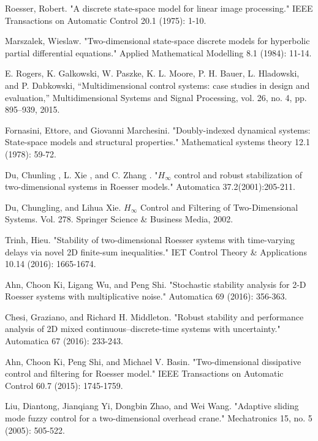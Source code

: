 \documentclass[conference]{IEEEtran}
\begin{document}
\begin{thebibliography}{1}
	
	
	
	
	
	
	
	Roesser, Robert. "A discrete state-space model for linear image processing." IEEE Transactions on Automatic Control 20.1 (1975): 1-10.
	
	Marszalek, Wieslaw. "Two-dimensional state-space discrete models for hyperbolic partial differential equations." Applied Mathematical Modelling 8.1 (1984): 11-14.
	
	E. Rogers, K. Galkowski, W. Paszke, K. L. Moore, P. H. Bauer, L. Hladowski, and P. Dabkowski, “Multidimensional control systems: case studies in design and evaluation,” Multidimensional Systems and Signal Processing, vol. 26, no. 4, pp. 895–939, 2015.
	
	Fornasini, Ettore, and Giovanni Marchesini. "Doubly-indexed dynamical systems: State-space models and structural properties." Mathematical systems theory 12.1 (1978): 59-72.
	
	Du, Chunling , L. Xie , and C. Zhang . "$H_{\infty}$ control and robust stabilization of two-dimensional systems in Roesser models." Automatica 37.2(2001):205-211.
	
	Du, Chungling, and Lihua Xie. $H_{\infty}$ Control and Filtering of Two-Dimensional Systems. Vol. 278. Springer Science \& Business Media, 2002.
	
	Trinh, Hieu. "Stability of two-dimensional Roesser systems with time-varying delays via novel 2D finite-sum inequalities." IET Control Theory \& Applications 10.14 (2016): 1665-1674.
	
	Ahn, Choon Ki, Ligang Wu, and Peng Shi. "Stochastic stability analysis for 2-D Roesser systems with multiplicative noise." Automatica 69 (2016): 356-363.
	
	Chesi, Graziano, and Richard H. Middleton. "Robust stability and performance analysis of 2D mixed continuous–discrete-time systems with uncertainty." Automatica 67 (2016): 233-243.
	
	Ahn, Choon Ki, Peng Shi, and Michael V. Basin. "Two-dimensional dissipative control and filtering for Roesser model." IEEE Transactions on Automatic Control 60.7 (2015): 1745-1759.
	
	Liu, Diantong, Jianqiang Yi, Dongbin Zhao, and Wei Wang. "Adaptive sliding mode fuzzy control for a two-dimensional overhead crane." Mechatronics 15, no. 5 (2005): 505-522.
	

\end{thebibliography}
\end{document}
